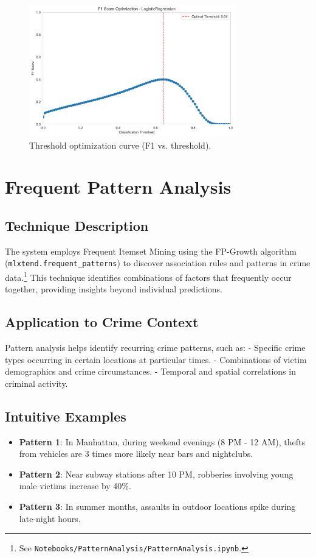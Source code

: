\documentclass{article}
\begin{document}
\begin{figure}[H]
\centering
\includegraphics[width=0.8\textwidth]{LogisticRegression_f1_threshold_optimization.png}
\caption{Threshold optimization curve (F1 vs. threshold).}
\end{figure}

\section{Frequent Pattern Analysis}

\subsection{Technique Description}
The system employs Frequent Itemset Mining using the FP-Growth algorithm (\texttt{mlxtend.frequent\_patterns}) to discover association rules and patterns in crime data.\footnote{See \texttt{Notebooks/PatternAnalysis/PatternAnalysis.ipynb}.} This technique identifies combinations of factors that frequently occur together, providing insights beyond individual predictions.

\subsection{Application to Crime Context}
Pattern analysis helps identify recurring crime patterns, such as:
- Specific crime types occurring in certain locations at particular times.
- Combinations of victim demographics and crime circumstances.
- Temporal and spatial correlations in criminal activity.

\subsection{Intuitive Examples}
\begin{itemize}
\item \textbf{Pattern 1}: In Manhattan, during weekend evenings (8 PM - 12 AM), thefts from vehicles are 3 times more likely near bars and nightclubs.
\item \textbf{Pattern 2}: Near subway stations after 10 PM, robberies involving young male victims increase by 40\%.
\item \textbf{Pattern 3}: In summer months, assaults in outdoor locations spike during late-night hours.
\end{itemize}
\end{document}
